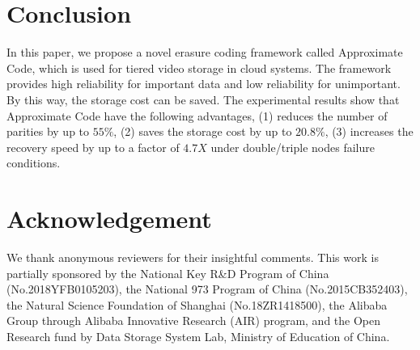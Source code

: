 \documentclass[sigconf]{acmart}
\begin{document}
\section{Conclusion}\label{Conclusion}
In this paper, we propose a novel erasure coding framework called Approximate Code, which is used for tiered video storage in cloud systems. The framework provides high reliability for important data and low reliability for unimportant. By this way, the storage cost can be saved. The experimental results show that Approximate Code have the following advantages, (1) reduces the number of parities by up to $55\%$, (2) saves the storage cost by up to $20.8\%$, (3) increases the recovery speed by up to a factor of $4.7X$ under double/triple nodes failure conditions.

\section*{Acknowledgement}
We thank anonymous reviewers for their insightful comments. This work is partially sponsored by the National Key R\&D Program of China (No.2018YFB0105203), the National 973 Program of China (No.2015CB352403), the Natural Science Foundation of Shanghai (No.18ZR1418500), the Alibaba Group through Alibaba Innovative Research (AIR) program, and the Open Research fund by Data Storage System Lab, Ministry of Education of China.



\end{document}
